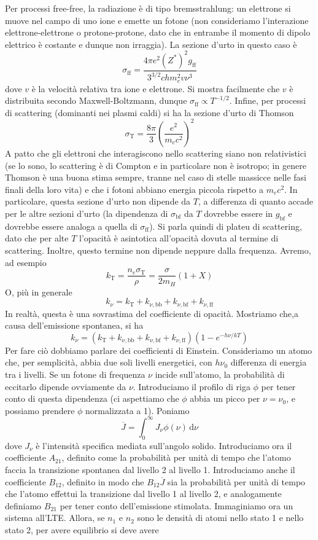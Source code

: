 \documentclass[a4paper,11pt]{article}
\renewcommand{\d}{\mathrm{d}} %
\renewcommand{\d}{\,\mathrm{d}}
\theoremstyle{theorem}
\theoremstyle{definition}
\begin{document}
\begin{itemize}
		\noindent Per processi free-free, la radiazione è di tipo bremsstrahlung: un elettrone si muove nel campo di uno ione e emette un fotone (non consideriamo l'interazione elettrone-elettrone o protone-protone, dato che in entrambe il momento di dipolo elettrico è costante e dunque non irraggia). La sezione d'urto in questo caso è
		\[\sigma_\textrm{ff}=\frac{4\pi e^2(Z^*)^2g_\textrm{ff}}{3^{3/2}chm_e^2v\nu^3}\]
		dove $v$ è la velocità relativa tra ione e elettrone. Si mostra facilmente che $v$ è distribuita secondo Maxwell-Boltzmann, dunque $\sigma_\textrm{ff}\propto T^{-1/2}$. Infine, per processi di scattering (dominanti nei plasmi caldi) si ha la sezione d'urto di Thomson
		\[\sigma_\textrm{T}=\frac{8\pi}{3}\left(\frac{e^2}{m_ec^2}\right)^2\]
		A patto che gli elettroni che interagiscono nello scattering siano non relativistici (se lo sono, lo scattering è di Compton e in particolare non è isotropo; in genere Thomson è una buona stima sempre, tranne nel caso di stelle massicce nelle fasi finali della loro vita) e che i fotoni abbiano energia piccola rispetto a $m_ec^2$. In particolare, questa sezione d'urto non dipende da $T$, a differenza di quanto accade per le altre sezioni d'urto (la dipendenza di $\sigma_\textrm{bf}$ da $T$ dovrebbe essere in $g_\textrm{bf}$ e dovrebbe essere analoga a quella di $\sigma_\textrm{ff}$). Si parla quindi di plateu di scattering, dato che per alte $T$ l'opacità è asintotica all'opacità dovuta al termine di scattering. Inoltre, questo termine non dipende neppure dalla frequenza. Avremo, ad esempio
		\[k_\textrm{T}=\frac{n_e\sigma_\textrm{T}}{\rho}=\frac{\sigma}{2m_H}(1+X)\]
		O, più in generale
		\[k_\nu=k_\textrm{T}+k_{\nu,\textrm{bb}}+k_{\nu,\textrm{bf}}+k_{\nu,\textrm{ff}}\]
		In realtà, questa è una sovrastima del coefficiente di opacità. Mostriamo che,a causa dell'emissione spontanea, si ha
		\[k_\nu=(k_\textrm{T}+k_{\nu,\textrm{bb}}+k_{\nu,\textrm{bf}}+k_{\nu,\textrm{ff}})(1-e^{-h\nu/kT})\]
		Per fare ciò dobbiamo parlare dei coefficienti di Einstein. Consideriamo un atomo che, per semplicità, abbia due soli livelli energetici, con $h\nu_0$ differenza di energia tra i livelli. Se un fotone di frequenza $\nu$ incide sull'atomo, la probabilità di eccitarlo dipende ovviamente da $\nu$. Introduciamo il profilo di riga $\phi$ per tener conto di questa dipendenza (ci aspettiamo che $\phi$ abbia un picco per $\nu=\nu_0$, e possiamo prendere $\phi$ normalizzata a 1). Poniamo
		\[\overline{J}=\int_{0}^{\infty}J_\nu\phi(\nu)\d\nu\]
		dove $J_\nu$ è l'intensità specifica mediata sull'angolo solido. Introduciamo ora il coefficiente $A_{21}$, definito come la probabilità per unità di tempo che l'atomo faccia la transizione spontanea dal livello 2 al livello 1. Introduciamo anche il coefficiente $B_{12}$, definito in modo che $B_{12}\overline{J}$ sia la probabilità per unità di tempo che l'atomo effettui la transizione dal livello 1 al livello 2, e analogamente definiamo $B_{21}$ per tener conto dell'emissione stimolata. Immaginiamo ora un sistema all'LTE. Allora, se $n_1$ e $n_2$ sono le densità di atomi nello stato 1 e nello stato 2, per avere equilibrio si deve avere

\end{itemize}
\end{document}
